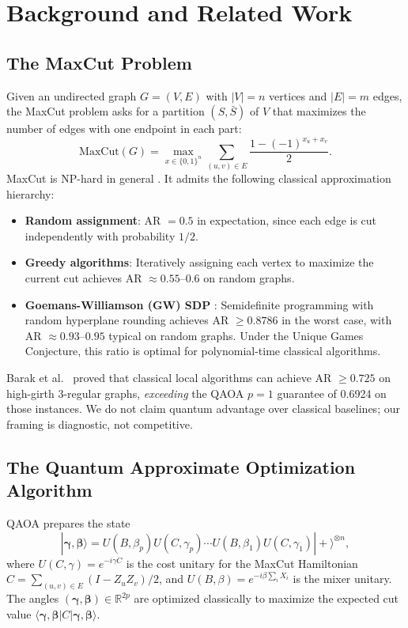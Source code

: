 \documentclass[12pt]{article}
\begin{document}
\section{Background and Related Work}

\subsection{The MaxCut Problem}

Given an undirected graph $G = (V, E)$ with $|V| = n$ vertices and $|E| = m$ edges, the MaxCut problem asks for a partition $(S, \bar{S})$ of $V$ that maximizes the number of edges with one endpoint in each part:
\[
\text{MaxCut}(G) = \max_{x \in \{0,1\}^n} \sum_{(u,v) \in E} \frac{1 - (-1)^{x_u + x_v}}{2}.
\]
MaxCut is NP-hard in general \cite{goemans1995maxcut}. It admits the following classical approximation hierarchy:
\begin{itemize}
  \item \textbf{Random assignment}: AR $= 0.5$ in expectation, since each edge is cut independently with probability $1/2$.
  \item \textbf{Greedy algorithms}: Iteratively assigning each vertex to maximize the current cut achieves AR $\approx 0.55$--$0.6$ on random graphs.
  \item \textbf{Goemans-Williamson (GW) SDP} \cite{goemans1995maxcut}: Semidefinite programming with random hyperplane rounding achieves AR $\geq 0.8786$ in the worst case, with AR $\approx 0.93$--$0.95$ typical on random graphs. Under the Unique Games Conjecture, this ratio is optimal for polynomial-time classical algorithms.
\end{itemize}

Barak et al.\ \cite{barak2021classical} proved that classical local algorithms can achieve AR $\geq 0.725$ on high-girth 3-regular graphs, \emph{exceeding} the QAOA $p = 1$ guarantee of 0.6924 \cite{farhi2014qaoa} on those instances. We do not claim quantum advantage over classical baselines; our framing is diagnostic, not competitive.

\subsection{The Quantum Approximate Optimization Algorithm}

QAOA \cite{farhi2014qaoa} prepares the state
\[
|\boldsymbol{\gamma}, \boldsymbol{\beta}\rangle = U(B, \beta_p) U(C, \gamma_p) \cdots U(B, \beta_1) U(C, \gamma_1) |+\rangle^{\otimes n},
\]
where $U(C, \gamma) = e^{-i\gamma C}$ is the cost unitary for the MaxCut Hamiltonian $C = \sum_{(u,v)\in E}(I - Z_u Z_v)/2$, and $U(B, \beta) = e^{-i\beta \sum_i X_i}$ is the mixer unitary. The angles $(\boldsymbol{\gamma}, \boldsymbol{\beta}) \in \mathbb{R}^{2p}$ are optimized classically to maximize the expected cut value $\langle \boldsymbol{\gamma}, \boldsymbol{\beta} | C | \boldsymbol{\gamma}, \boldsymbol{\beta} \rangle$.
\end{document}
